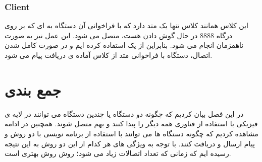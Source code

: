 \subsubsection{Client}
این کلاس همانند کلاس 
تنها یک متد
 دارد که با فراخوانی آن دستگاه به 
ای که بر روی درگاه 8888 در حال گوش دادن هست، متصل می شود. این عمل نیز به صورت ناهمزمان انجام می شود. بنابراین از یک
استفاده کرده ایم و در صورت کامل شدن اتصال، دستگاه با فراخوانی متد
از کلاس 
آماده ی دریافت پیام می شود.

\section{جمع بندی}
در این فصل بیان کردیم که چگونه دو دستگاه یا چندین دستگاه می توانند در لایه ی فیزیکی با استفاده از فناوری 
همه دیگر را پیدا کنند و بهم متصل شوند.
همچنین در ادامه مشاهده کردیم که چگونه دستگاه ها می توانند با استفاده از برنامه نویسی
 با دو روش 
 و
 پیام ارسال و دریافت کنند. با توجه به ویژگی های هر کدام از این دو روش به این نتیجه رسیده ایم که زمانی که تعداد اتصالات زیاد می شود؛ روش 
 روش بهتری است.





